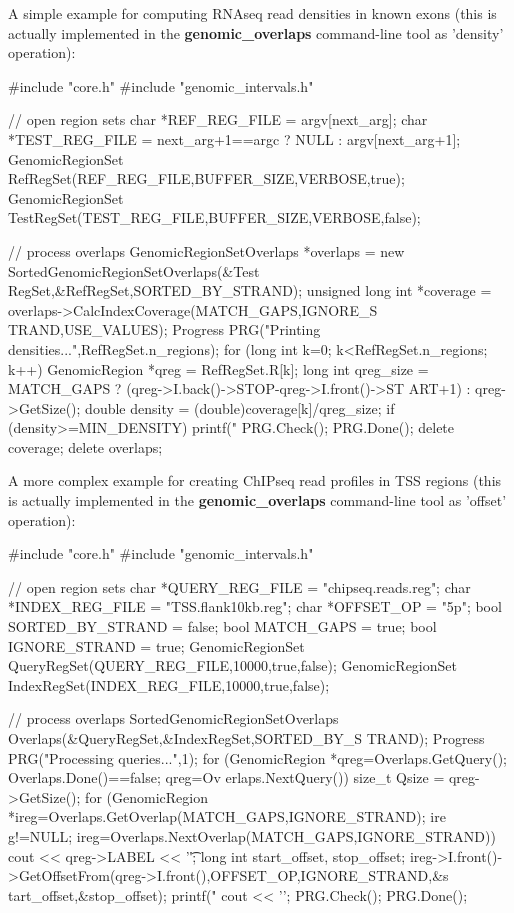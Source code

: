 A simple example for computing RNAseq read densities in known exons (this is actually implemented in the {\bfseries genomic\_\-overlaps} command-\/line tool as 'density' operation): 
\begin{DoxyCode}
    #include "core.h"
    #include "genomic_intervals.h"
 
    // open region sets
    char *REF_REG_FILE = argv[next_arg];
    char *TEST_REG_FILE = next_arg+1==argc ? NULL : argv[next_arg+1];
    GenomicRegionSet RefRegSet(REF_REG_FILE,BUFFER_SIZE,VERBOSE,true);
    GenomicRegionSet TestRegSet(TEST_REG_FILE,BUFFER_SIZE,VERBOSE,false);

    // process overlaps
    GenomicRegionSetOverlaps *overlaps = new SortedGenomicRegionSetOverlaps(&Test
      RegSet,&RefRegSet,SORTED_BY_STRAND);
    unsigned long int *coverage = overlaps->CalcIndexCoverage(MATCH_GAPS,IGNORE_S
      TRAND,USE_VALUES); 
    Progress PRG("Printing densities...",RefRegSet.n_regions);
    for (long int k=0; k<RefRegSet.n_regions; k++) {
      GenomicRegion *qreg = RefRegSet.R[k];
      long int qreg_size = MATCH_GAPS ? (qreg->I.back()->STOP-qreg->I.front()->ST
      ART+1) : qreg->GetSize();
      double density = (double)coverage[k]/qreg_size;
      if (density>=MIN_DENSITY) printf("%
      PRG.Check();
    }
    PRG.Done();
    delete coverage;
    delete overlaps;
\end{DoxyCode}
 A more complex example for creating ChIPseq read profiles in TSS regions (this is actually implemented in the {\bfseries genomic\_\-overlaps} command-\/line tool as 'offset' operation): 
\begin{DoxyCode}
    #include "core.h"
    #include "genomic_intervals.h"
 
    // open region sets
    char *QUERY_REG_FILE = "chipseq.reads.reg";
    char *INDEX_REG_FILE = "TSS.flank10kb.reg";
    char *OFFSET_OP = "5p";
    bool SORTED_BY_STRAND = false; 
    bool MATCH_GAPS = true;
    bool IGNORE_STRAND = true;
    GenomicRegionSet QueryRegSet(QUERY_REG_FILE,10000,true,false);
    GenomicRegionSet IndexRegSet(INDEX_REG_FILE,10000,true,false);

    // process overlaps
    SortedGenomicRegionSetOverlaps Overlaps(&QueryRegSet,&IndexRegSet,SORTED_BY_S
      TRAND);
    Progress PRG("Processing queries...",1);
    for (GenomicRegion *qreg=Overlaps.GetQuery(); Overlaps.Done()==false; qreg=Ov
      erlaps.NextQuery()) {
      size_t Qsize = qreg->GetSize();
      for (GenomicRegion *ireg=Overlaps.GetOverlap(MATCH_GAPS,IGNORE_STRAND); ire
      g!=NULL; ireg=Overlaps.NextOverlap(MATCH_GAPS,IGNORE_STRAND)) {
        cout << qreg->LABEL << '\t';
        long int start_offset, stop_offset;
        ireg->I.front()->GetOffsetFrom(qreg->I.front(),OFFSET_OP,IGNORE_STRAND,&s
      tart_offset,&stop_offset);
        printf("%
        cout << '\n';
      }
      PRG.Check();
    }
    PRG.Done();
\end{DoxyCode}
 

